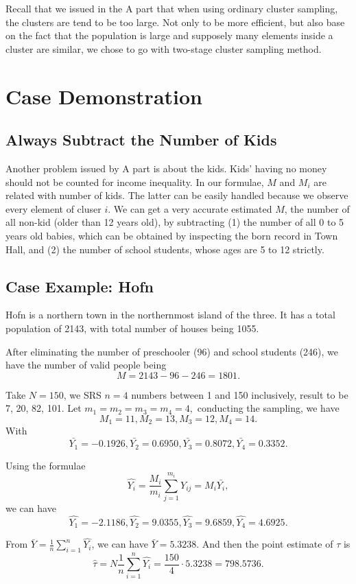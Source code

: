 \documentclass[12pt]{article}%
\begin{document}
Recall that we issued in the A part that 
when using ordinary cluster sampling, 
the clusters are tend to be too large. 
Not only to be more efficient, but also
base on the fact that the population is large and supposely many elements
inside a cluster are similar, 
we chose to go with two-stage cluster sampling method.

\section{Case Demonstration}
\subsection{Always Subtract the Number of Kids}
Another problem issued by A part is about the kids. 
Kids' having no money should not be counted for income inequality. 
In our formulae, $M$ and $M_i$ are related with number of kids. 
The latter can be easily handled because 
we observe every element of cluser $i$.
We can get a very accurate estimated $M$, 
the number of all non-kid (older than 12 years old), 
by subtracting (1) the number of all 0 to 5 years old babies, 
which can be obtained by inspecting the born record in Town Hall, and 
(2) the number of school students, whose ages are 5 to 12 strictly.

\subsection{Case Example: Hofn}
Hofn is a northern town in the northernmost island of the three. 
It has a total population of 2143, with total number of houses being 1055.

After eliminating the number of preschooler (96) and school students (246), 
we have the number of valid people being $$M=2143-96-246=1801.$$ 

Take $N=150$, we SRS $n=4$ numbers between 1 and 150 inclusively, 
result to be 7, 20, 82, 101. Let $m_1 = m_2 = m_3 = m_4 = 4,$
conducting the sampling, we have 
$$M_1 = 11, M_2 = 13, M_3 = 12, M_4=14.$$ 
With 
$$\bar{Y_1}=-0.1926, \bar{Y_2}=0.6950, 
\bar{Y_3}=0.8072, \bar{Y_4}=0.3352.$$

Using the formulae 
$$\hat{Y_i}=\frac{M_i}{m_i}\sum_{j=1}^{m_i}Y_{ij}=M_i \bar{Y_i},$$ 
we can have 
$$
\hat{Y_1}=-2.1186, \hat{Y_2}=9.0355,
\hat{Y_3}=9.6859, \hat{Y_4}=4.6925.
$$

From $\bar{Y}=\frac{1}{n}\sum_{i=1}^n \hat{Y_i}$, 
we can have $\bar{Y}=5.3238$. 
And then the point estimate of $\tau$ is 
$$\hat{\tau}
= N\frac{1}{n} \sum_{i=1}^n \hat{Y_i} 
= \frac{150}{4}\cdot 5.3238=798.5736.$$
\end{document}
